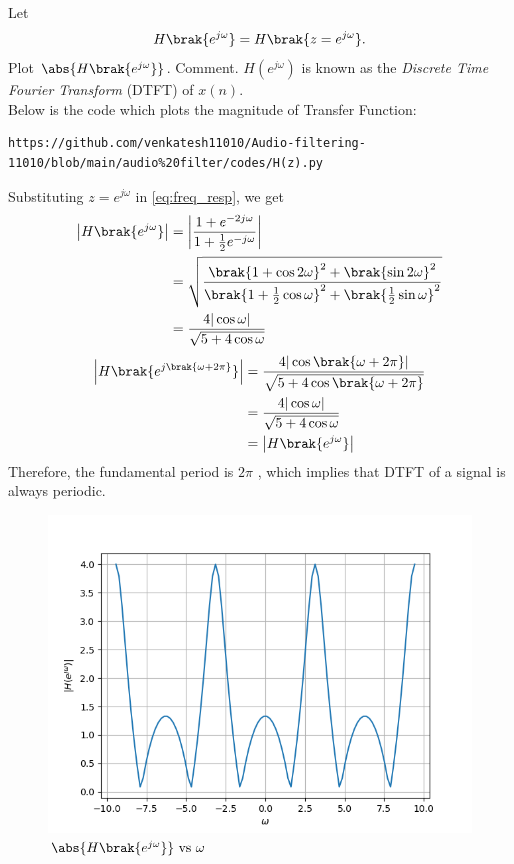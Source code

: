 \documentclass[journal,12pt,twocolumn]{IEEEtran}
\theoremstyle{remark}
\begin{document}
\begin{enumerate}[label=\thesection.\arabic*]
Let
\begin{equation}
	H\brak{e^{j \omega}} = H\brak{z = e^{j \omega}}.
\end{equation}
Plot $\abs{H\brak{e^{j \omega}}}$.  Comment.  $H(e^{j \omega})$ is
known as the {\em Discrete Time Fourier Transform} (DTFT) of $x(n)$.
\\
\solution Below is the code which plots the magnitude of Transfer Function:
\begin{lstlisting}
https://github.com/venkatesh11010/Audio-filtering-11010/blob/main/audio%20filter/codes/H(z).py
\end{lstlisting}
Substituting $z = e^{j \omega}$ in \eqref{eq:freq_resp}, we get
\begin{align}
	\left|H\brak{e^{j\omega}}\right| &= \left|\frac{1 + e^{-2j\omega}}{1 + \frac{1}{2}e^{-j\omega}}\right| \\
									  &= \sqrt{\frac{\brak{1 + \cos{2\omega}}^2 + \brak{\sin{2\omega}}^2}{\brak{1 + \frac{1}{2}\cos{\omega}}^2 + \brak{\frac{1}{2}\sin{\omega}}^2}}\\
									  &= \frac{4|\cos{\omega}|}{\sqrt{5 + 4\cos{\omega}}}
\end{align}
\begin{align}
	\left|H\brak{e^{j\brak{\omega + 2\pi}}}\right| &= \frac{4|\cos\brak{\omega + 2\pi}|}{\sqrt{5 + 4\cos\brak{\omega + 2\pi}}} \\
											   &= \frac{4|\cos{\omega}|}{\sqrt{5 + 4\cos{\omega}}} \\
											   &= \left|H\brak{e^{j\omega}}\right|	
\end{align}
Therefore, the fundamental period is $2\pi$ , which implies that DTFT of a signal is always periodic.

\begin{figure}[!ht]
\centering
\includegraphics[width=\columnwidth]{figs/H(z).png}
\caption{$\abs{H\brak{e^{j\omega}}} \text{ vs } \omega$}
\label{fig:H(z)_3.5}
\end{figure}
\end{enumerate}
\end{document}
